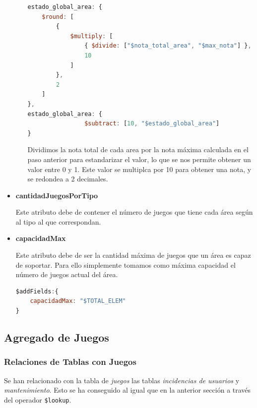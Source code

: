 \documentclass[]{article}
\begin{document}
\begin{itemize}
\begin{enumerate}
        \begin{lstlisting}[language=JavaScript, caption=Cálculo de estado\_global\_area]
estado_global_area: {
    $round: [
        {
            $multiply: [
                { $divide: ["$nota_total_area", "$max_nota"] },
                10
            ]
        },
        2
    ]
},
estado_global_area: {
                $subtract: [10, "$estado_global_area"]
}
        \end{lstlisting}

        Dividimos la nota total de cada area por la nota máxima calculada en el paso anterior para estandarizar el valor, lo que se nos permite obtener un valor entre 0 y 1. Este valor se multiplca por 10 para obtener una nota, y se redondea a 2 decimales.

    \end{enumerate}

    \item \textbf{cantidadJuegosPorTipo}
    
    Este atributo debe de contener el número de juegos que tiene cada área según al tipo al que correspondan.

    \item \textbf{capacidadMax}
    
    Este atributo debe de ser la cantidad máxima de juegos que un área es capaz de soportar. Para ello simplemente tomamos como máxima capacidad el número de juegos actual del área.
    \begin{lstlisting}[language=JavaScript, caption=Cálculo de la capacidad máxima]
$addFields:{
    capacidadMax: "$TOTAL_ELEM"
}
    \end{lstlisting}
\end{itemize}

\subsection{Agregado de Juegos}
\label{subsec:agregado_juego}

\subsubsection{Relaciones de Tablas con Juegos}
\label{subsubsec:relaciones_juego}

Se han relacionado con la tabla de \textit{juegos} las tablas \textit{incidencias de usuarios} y \textit{mantenimiento}. Esto se ha conseguido al igual que en la anterior sección a través del operador \texttt{\$lookup}.
\end{document}
